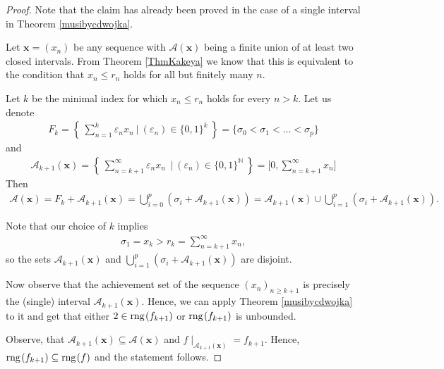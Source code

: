 \documentclass{amsart}
\theoremstyle{definition}
\newcommand{\rng}{{\rm rng} \hspace{0.03cm}}
\begin{document}
\begin{proof}
Note that the claim has already been proved in the case of a single interval in Theorem \ref{musibycdwojka}.

Let $\mathbf{x}=(x_n)$ be any sequence with $\mathcal{A}(\mathbf{x})$ being a finite union of at least two closed intervals. %
From Theorem \ref{ThmKakeya} we know that this is equivalent to the condition that $x_n\leq r_n$ holds for all but finitely many $n$.

Let $k$ be the minimal index for which $x_n\leq r_n$ holds for every $n>k$. Let us denote 
\begin{align*}
F_k=\left\{\ \sum_{n=1}^{k}\varepsilon_n x_n\  \Bigg|\ (\varepsilon_n)\in\{0,1\}^k\ \right\}=\{\sigma_0<\sigma_1<\ldots<\sigma_p\}
\end{align*}
and
\begin{align*}
\mathcal{A}_{k+1}(\mathbf{x})=\left\{\ \sum_{n=k+1}^{\infty}\varepsilon_n x_n\ \ \Bigg|\ (\varepsilon_n)\in\{0,1\}^{\mathbb{N}}\ \right\}=\bigg[0,\sum_{n=k+1}^{\infty} x_n \bigg]
\end{align*}
Then 
\begin{align*}
\mathcal{A}(\mathbf{x})=F_k + \mathcal{A}_{k+1}(\mathbf{x})=\bigcup_{i=0}^{p} (\sigma_i + \mathcal{A}_{k+1}(\mathbf{x}))= \mathcal{A}_{k+1}(\mathbf{x})\cup\bigcup_{i=1}^{p} (\sigma_i + \mathcal{A}_{k+1}(\mathbf{x})).
\end{align*}

Note that our choice of $k$ implies
\begin{align*}
\sigma_1 = x_k > r_{k} = \sum_{n=k+1}^{\infty}x_n,
\end{align*}
so the sets  $\mathcal{A}_{k+1}(\mathbf{x})$ and $\bigcup_{i=1}^{p} (\sigma_i + \mathcal{A}_{k+1}(\mathbf{x}))$ are disjoint.

Now observe that the achievement set of the sequence $(x_{n})_{n\geq k+1}$ is precisely the (single) interval $\mathcal{A}_{k+1}(\mathbf{x})$. Hence, we can apply Theorem \ref{musibycdwojka} to it and get that either $2\in \rng (f_{k+1})$ or $\rng (f_{k+1})$ is unbounded.

Observe, that $\mathcal{A}_{k+1}(\mathbf{x})\subseteq \mathcal{A}(\mathbf{x})$ and $f\mid_{\mathcal{A}_{k+1}(\mathbf{x})} = f_{k+1}$. Hence, $\rng (f_{k+1})\subseteq \rng (f)$ and the statement follows.



\end{proof}
\end{document}
